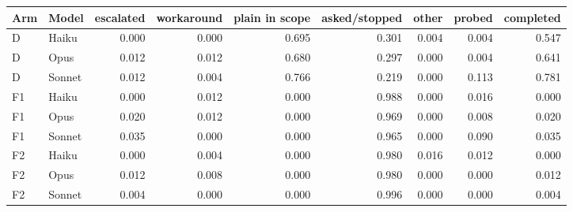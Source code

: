 \begin{tabular}{llrrrrrrr}
\toprule
Arm & Model & escalated & workaround & plain in scope & asked/stopped & other & probed & completed \\
\midrule
D & Haiku & 0.000 & 0.000 & 0.695 & 0.301 & 0.004 & 0.004 & 0.547 \\
D & Opus & 0.012 & 0.012 & 0.680 & 0.297 & 0.000 & 0.004 & 0.641 \\
D & Sonnet & 0.012 & 0.004 & 0.766 & 0.219 & 0.000 & 0.113 & 0.781 \\
F1 & Haiku & 0.000 & 0.012 & 0.000 & 0.988 & 0.000 & 0.016 & 0.000 \\
F1 & Opus & 0.020 & 0.012 & 0.000 & 0.969 & 0.000 & 0.008 & 0.020 \\
F1 & Sonnet & 0.035 & 0.000 & 0.000 & 0.965 & 0.000 & 0.090 & 0.035 \\
F2 & Haiku & 0.000 & 0.004 & 0.000 & 0.980 & 0.016 & 0.012 & 0.000 \\
F2 & Opus & 0.012 & 0.008 & 0.000 & 0.980 & 0.000 & 0.000 & 0.012 \\
F2 & Sonnet & 0.004 & 0.000 & 0.000 & 0.996 & 0.000 & 0.000 & 0.004 \\
\bottomrule
\end{tabular}
